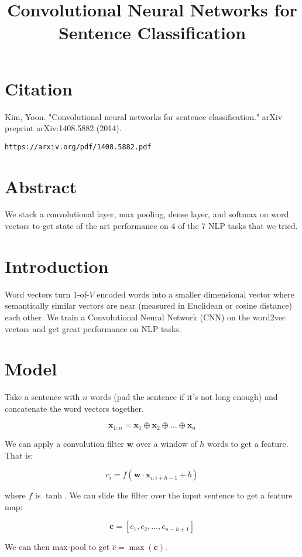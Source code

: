 \documentclass[a4paper]{article}
\title{Convolutional Neural Networks for Sentence Classification}
\date{}
\begin{document}
\maketitle

\section{Citation}
Kim, Yoon. "Convolutional neural networks for sentence classification." arXiv preprint arXiv:1408.5882 (2014).

\begin{verbatim}
https://arxiv.org/pdf/1408.5882.pdf
\end{verbatim}

\section{Abstract}
We stack a convolutional layer, max pooling, dense layer, and softmax on
word vectors to get state of the art performance on 4 of the 7 NLP tasks
that we tried.

\section{Introduction}
Word vectors turn $1$-of-$V$ encoded words into a smaller dimensional vector
where semantically similar vectors are near (measured in Euclidean or cosine
distance) each other. We train a Convolutional Neural Network (CNN) on the
word2vec vectors and get great performance on NLP tasks.

\section{Model}
Take a sentence with $n$ words (pad the sentence if it's not long enough)
and concatenate the word vectors together.

$$
\mathbf{x}_{1:n} = \mathbf{x}_1 \oplus \mathbf{x}_2 \oplus ... \oplus
\mathbf{x}_n
$$

We can apply a convolution filter $\mathbf{w}$ over a window of $h$ words to get
a feature. That is:

$$
c_i = f(\mathbf{w} \cdot \mathbf{x}_{i:i+h-1} + b)
$$

where $f$ is $\tanh$. We can slide the filter over the input sentence to get a
feature map:

$$
\mathbf{c} = [c_1, c_2, ..., c_{n-h+1}]
$$

We can then max-pool to get $\hat{c} = \max({\mathbf{c}})$.
\end{document}
